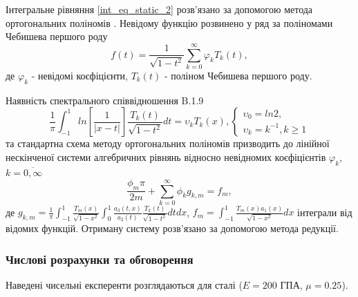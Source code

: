 Інтегральне рівняння \eqref{int_eq_static_2} розв'язано за допомогою метода ортогональних поліномів \cite{popov_3}.
Невідому функцію розвинено у ряд за поліномами Чебишева першого роду
\begin{equation}\label{unk_fun_static_2}
    f(t) = \frac{1}{\sqrt{1 - t^2}} \sum_{k=0}^{\infty} \varphi_k T_{k}(t),
\end{equation}
де $\varphi_k$ - невідомі коєфіцієнти, $T_{k}(t)$ - поліном Чебишева першого роду.

Наявність спектрального співвідношення B.1.9 \cite{ortogonal}
\begin{equation}
    \frac{1}{\pi} \int_{-1}^{1} ln\left[ \frac{1}{\lvert x - t \rvert} \right] \frac{T_k(t)}{\sqrt{1 - t^2}} dt = \upsilon_k T_k(x),
    \begin{cases}
        \upsilon_0 = ln 2, \\
        \upsilon_k = k^{-1}, k \ge 1
    \end{cases}
\end{equation} 
та стандартна схема методу ортогональних поліномів призводить до лінійної нескінченої системи алгебричних рівнянь відносно невідномих коєфіцієнтів $\varphi_k$, $k=\overline{0, \infty}$
\begin{equation}\label{int_system_static_2}
    \frac{\phi_m \pi}{2m} + \sum_{k=0}^{\infty} \phi_k g_{k, m} = f_m,
\end{equation}
де $g_{k, m} = \frac{1}{\pi} \int_{-1}^{1} \frac{T_{m}(x)}{\sqrt{1 - x^2}} \int_{0}^{1} \frac{a_3(t, x )}{a_2(t)} \frac{T_{k}(t)}{\sqrt{1 - t^2}} dt dx$,
$f_m = \int_{-1}^{1} \frac{T_{m}(x) a_1(x)}{\sqrt{1 - x^2}} dx$ інтеграли від відомих функцій.
Отриману систему розв'язано за допомогою метода редукції.

\subsubsection{Числові розрахунки та обговорення}
Наведені чисельні експеренти розглядаються для сталі ($E=200$ ГПА, $\mu=0.25$).

